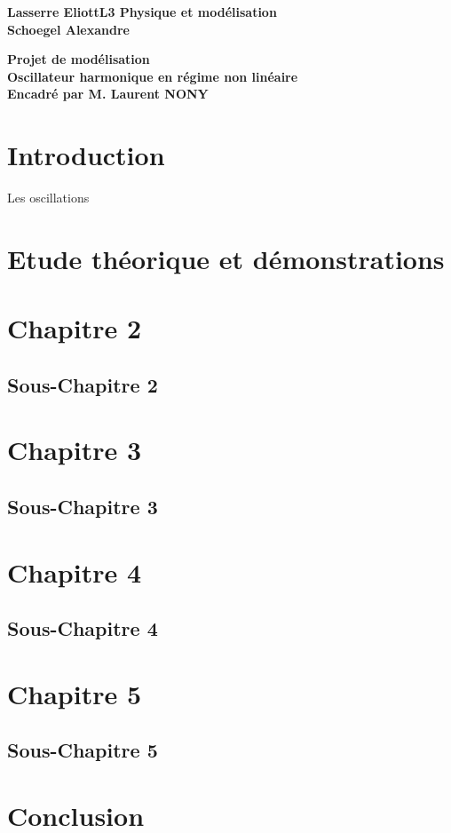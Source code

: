 \documentclass[12pt]{article}
\newcommand{\nomA}{Lasserre Eliott}
\newcommand{\nomB}{Schoegel Alexandre}
\newcommand{\cours}{Projet de modélisation}
\newcommand{\titre}{Oscillateur harmonique en régime non linéaire}
\newcommand{\classe}{L3 Physique et modélisation}
\begin{document}
\textbf{\large \nomA}\hfill\textbf{\large \classe}\\
\textbf{\large \nomB}\\

\vspace{8\baselineskip}

\begin{center}
    \textbf{\Huge \cours}\\
    \vspace{10\baselineskip}
     \textbf{\Huge \titre}\\
     \vspace{10\baselineskip}
     \textbf{\large Encadré par M. Laurent NONY}
\end{center}

\newpage

\large \tableofcontents

\newpage

    \section{Introduction}
 
Les oscillations
    
    \newpage
    \section{Etude théorique et démonstrations}
    
    \newpage
    \section{Chapitre 2}
        \subsection{Sous-Chapitre 2}
        
        
    \newpage
    \section{Chapitre 3}
        \subsection{Sous-Chapitre 3}
        
        
    \newpage
    \section{Chapitre 4}
        \subsection{Sous-Chapitre 4}
        
        
    \newpage    
    \section{Chapitre 5}
        \subsection{Sous-Chapitre 5}
        
        
    \newpage    
    \section{Conclusion}
\end{document}
